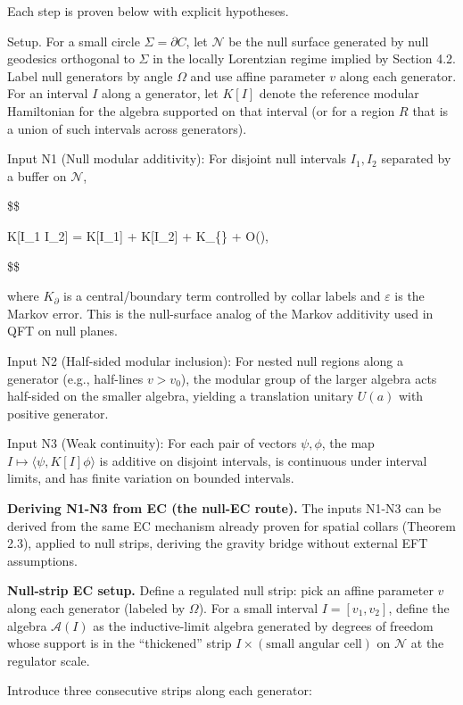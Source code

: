 \documentclass[11pt,a4paper]{article}
\theoremstyle{remark}
\begin{document}
Each step is proven below with explicit hypotheses.

Setup. For a small circle \(\Sigma = \partial C\), let \(\mathcal N\) be the null
surface generated by null geodesics orthogonal to \(\Sigma\) in the locally
Lorentzian regime implied by Section 4.2. Label null generators by angle
\(\Omega\) and use affine parameter \(v\) along each generator. For an interval
\(I\) along a generator, let \(K[I]\) denote the reference modular Hamiltonian for
the algebra supported on that interval (or for a region \(R\) that is a union of
such intervals across generators).

Input N1 (Null modular additivity): For disjoint null intervals \(I_1, I_2\)
separated by a buffer on \(\mathcal N\),

\$\$

K{[}I\_1 \cup I\_2{]} = K{[}I\_1{]} + K{[}I\_2{]} + K\_\{\partial\} + O(\varepsilon),

\$\$

where \(K_{\partial}\) is a central/boundary term controlled by collar labels
and \(\varepsilon\) is the Markov error. This is the null-surface analog of the
Markov additivity used in QFT on null planes.

Input N2 (Half-sided modular inclusion): For nested null regions along a
generator (e.g., half-lines \(v > v_0\)), the modular group of the larger
algebra acts half-sided on the smaller algebra, yielding a translation
unitary \(U(a)\) with positive generator.

Input N3 (Weak continuity): For each pair of vectors \(\psi,\phi\), the map
\(I \mapsto \langle \psi, K[I] \phi \rangle\) is additive on disjoint intervals,
is continuous under interval limits, and has finite variation on bounded
intervals.

\textbf{Deriving N1-N3 from EC (the null-EC route).} The inputs N1-N3 can be
derived from the same EC mechanism already proven for spatial collars
(Theorem 2.3), applied to null strips, deriving the gravity bridge
without external EFT assumptions.

\textbf{Null-strip EC setup.} Define a regulated null strip: pick an affine
parameter \(v\) along each generator (labeled by \(\Omega\)). For a small interval
\(I = [v_1, v_2]\), define the algebra \(\mathcal{A}(I)\) as the inductive-limit
algebra generated by degrees of freedom whose support is in the ``thickened''
strip \(I \times (\text{small angular cell})\) on \(\mathcal{N}\) at the regulator
scale.

Introduce three consecutive strips along each generator:
\end{document}
